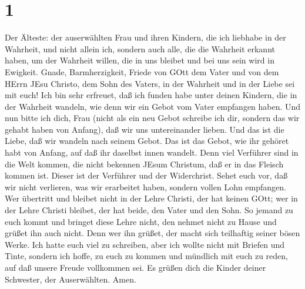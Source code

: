 \hypertarget{section}{%
\section{1}\label{section}}

 Der Älteste: der auserwählten Frau und ihren Kindern, die
ich liebhabe in der Wahrheit, und nicht allein ich, sondern auch alle,
die die Wahrheit erkannt haben,  um der Wahrheit willen, die
in uns bleibet und bei uns sein wird in Ewigkeit.  Gnade,
Barmherzigkeit, Friede von GOtt dem Vater und von dem HErrn JEsu
Christo, dem Sohn des Vaters, in der Wahrheit und in der Liebe sei mit
euch!  Ich bin sehr erfreuet, daß ich funden habe unter
deinen Kindern, die in der Wahrheit wandeln, wie denn wir ein Gebot vom
Vater empfangen haben.  Und nun bitte ich dich, Frau (nicht
als ein neu Gebot schreibe ich dir, sondern das wir gehabt haben von
Anfang), daß wir uns untereinander lieben.  Und das ist die
Liebe, daß wir wandeln nach seinem Gebot. Das ist das Gebot, wie ihr
gehöret habt von Anfang, auf daß ihr daselbst innen wandelt.
 Denn viel Verführer sind in die Welt kommen, die nicht
bekennen JEsum Christum, daß er in das Fleisch kommen ist. Dieser ist
der Verführer und der Widerchrist.  Sehet euch vor, daß wir
nicht verlieren, was wir erarbeitet haben, sondern vollen Lohn
empfangen.  Wer übertritt und bleibet nicht in der Lehre
Christi, der hat keinen GOtt; wer in der Lehre Christi bleibet, der hat
beide, den Vater und den Sohn.  So jemand zu euch kommt und
bringet diese Lehre nicht, den nehmet nicht zu Hause und grüßet ihn auch
nicht.  Denn wer ihn grüßet, der macht sich teilhaftig
seiner bösen Werke.  Ich hatte euch viel zu schreiben, aber
ich wollte nicht mit Briefen und Tinte, sondern ich hoffe, zu euch zu
kommen und mündlich mit euch zu reden, auf daß unsere Freude vollkommen
sei.  Es grüßen dich die Kinder deiner Schwester, der
Auserwählten. Amen.
